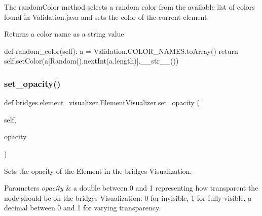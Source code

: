 The random\+Color method selects a random color from the available list of colors found in Validation.\+java and sets the color of the current element. 

\begin{DoxyReturn}{Returns}
a color name as a string value
\end{DoxyReturn}
def random\+\_\+color(self)\+: a = Validation.\+C\+O\+L\+O\+R\+\_\+\+N\+A\+M\+E\+S.\+to\+Array() return self.\+set\+Color(a\mbox{[}Random().next\+Int(a.\+length)\mbox{]}.\+\_\+\+\_\+str\+\_\+\+\_\+()) \mbox{\label{classbridges_1_1element__visualizer_1_1_element_visualizer_a2d29661b16e53fa3c9f9fa7aba20c8a0}} 
\subsubsection{\texorpdfstring{set\+\_\+opacity()}{set\_opacity()}}
{\footnotesize\ttfamily def bridges.\+element\+\_\+visualizer.\+Element\+Visualizer.\+set\+\_\+opacity (\begin{DoxyParamCaption}\item[{}]{self,  }\item[{}]{opacity }\end{DoxyParamCaption})}



Sets the opacity of the Element in the bridges Visualization. 


\begin{DoxyParams}{Parameters}
{\em opacity} & a double between 0 and 1 representing how transparent the node should be on the bridges Visualization. 0 for invisible, 1 for fully visible, a decimal between 0 and 1 for varying transparency. \\
\hline
\end{DoxyParams}
\mbox{\label{classbridges_1_1element__visualizer_1_1_element_visualizer_a3c299b071e967781c75009325813cdb1}} 
